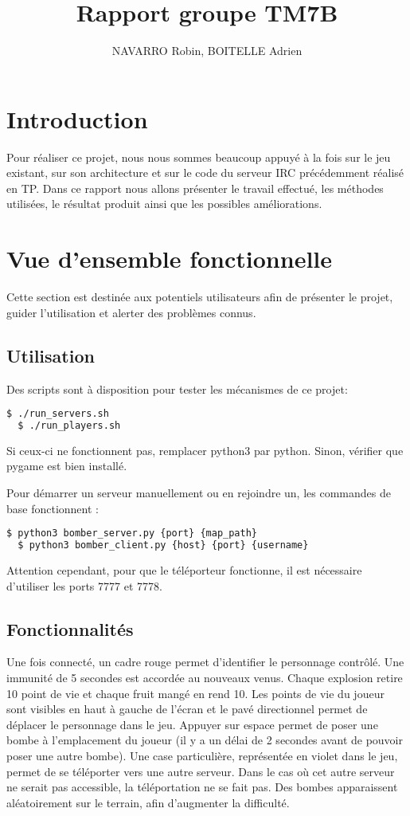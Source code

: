 \documentclass[12pt]{article}
\title{Rapport groupe TM7B}
\author{NAVARRO Robin, BOITELLE Adrien}
\begin{document}
\maketitle

\newpage
\tableofcontents
\newpage

\section{Introduction}
Pour réaliser ce projet, nous nous sommes beaucoup appuyé à la fois sur le jeu existant, sur son architecture et sur le code du serveur IRC précédemment réalisé en TP. Dans ce rapport nous allons présenter le travail effectué, les méthodes utilisées, le résultat produit ainsi que les possibles améliorations.

\section{Vue d'ensemble fonctionnelle}

Cette section est destinée aux potentiels utilisateurs afin de présenter le projet, guider l'utilisation et alerter des problèmes connus.

\subsection{Utilisation}

Des scripts sont à disposition pour tester les mécanismes de ce projet:
\begin{lstlisting}[language=bash]
  $ ./run_servers.sh
  $ ./run_players.sh
\end{lstlisting}
Si ceux-ci ne fonctionnent pas, remplacer python3 par python. Sinon, vérifier que pygame est bien installé.

Pour démarrer un serveur manuellement ou en rejoindre un, les commandes de base fonctionnent : 
\begin{lstlisting}[language=bash]
  $ python3 bomber_server.py {port} {map_path}
  $ python3 bomber_client.py {host} {port} {username}
\end{lstlisting}

Attention cependant, pour que le téléporteur fonctionne, il est nécessaire d'utiliser les ports 7777 et 7778.
\subsection{Fonctionnalités}
Une fois connecté, un cadre rouge permet d'identifier le personnage contrôlé. Une immunité de 5 secondes est accordée au nouveaux venus. Chaque explosion retire 10 point de vie et chaque fruit mangé en rend 10. Les points de vie du joueur sont visibles en haut à gauche de l'écran et le pavé directionnel permet de déplacer le personnage dans le jeu. Appuyer sur espace permet de poser une bombe à l'emplacement du joueur (il y a un délai de 2 secondes avant de pouvoir poser une autre bombe).
\newpage
Une case particulière, représentée en violet dans le jeu, permet de se téléporter vers une autre serveur.
Dans le cas où cet autre serveur ne serait pas accessible, la téléportation ne se fait pas.
Des bombes apparaissent aléatoirement sur le terrain, afin d'augmenter la difficulté.
\end{document}
